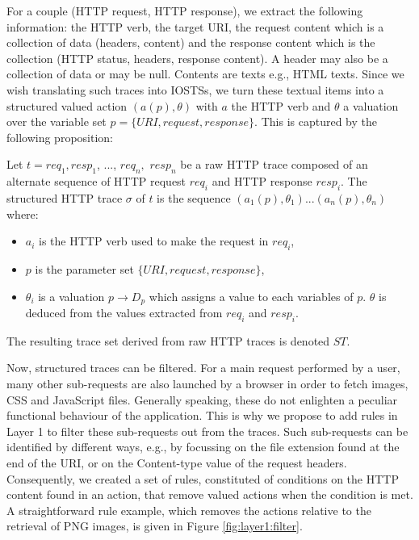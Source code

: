 For a couple  (HTTP request, HTTP response), we extract the
following information: the HTTP verb, the target URI, the request
content which is a collection of data (headers, content) and the
response content which is the collection (HTTP status, headers,
response content). A header may also be a collection of data or
may be null. Contents are texts e.g., HTML texts. Since we wish
translating such traces into IOSTSs, we turn these textual items
into a structured valued action $(a(p),\theta)$ with $a$ the HTTP
verb and $\theta$ a valuation over the variable set
$p=\{URI,request,response\}$. This is captured by the following
proposition:

\begin{definition} Let $t=
req_1,resp_1$, ..., $req_n,$ $resp_n$ be a raw HTTP trace
composed of an alternate sequence of HTTP request $req_i$ and
HTTP response $resp_i$. The structured HTTP trace $\sigma$ of $t$
is the sequence $(a_1(p),\theta_1)...(a_n(p),\theta_n)$ where:
\begin{itemize} \item $a_i$ is the HTTP verb used to make the
request in $req_i$, \item $p$ is the parameter set $\{URI,
request, response\}$, \item $\theta_i$ is a valuation $p
\rightarrow D_p$ which assigns a value to each variables of $p$.
$\theta$ is deduced from the values extracted from $req_i$ and
$resp_i$.

\end{itemize}
The resulting trace set derived from raw HTTP traces is denoted
$ST$.
\end{definition}

Now, structured traces can be filtered. For a main request
performed by a user, many other sub-requests are also launched by
a browser in order to fetch images, CSS and JavaScript files.
Generally speaking, these do not enlighten a peculiar functional
behaviour of the application. This is why we propose to add rules
in Layer 1 to filter these sub-requests out from the traces. Such
sub-requests can be identified by different ways, e.g., by
focussing on the file extension found at the end of the URI, or
on the Content-type value of the request headers. Consequently,
we created a set of rules, constituted of conditions on the HTTP
content found in an action, that remove valued actions when the
condition is met. A straightforward rule example, which removes
the actions relative to the retrieval of PNG images, is given in
Figure \ref{fig:layer1:filter}.

